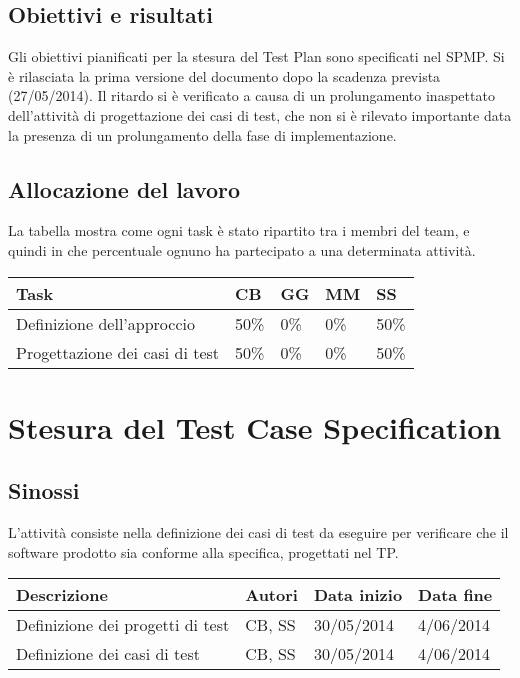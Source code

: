 \subsection{Obiettivi e risultati}
Gli obiettivi pianificati per la stesura del Test Plan sono specificati nel SPMP. Si è rilasciata la prima versione del documento dopo la scadenza prevista (27/05/2014). Il ritardo si è verificato a causa di un prolungamento inaspettato dell'attività di progettazione dei casi di test, che non si è rilevato importante data la presenza di un prolungamento della fase di implementazione.

\subsection{Allocazione del lavoro}
La tabella mostra come ogni task è stato ripartito tra i membri del team, e quindi in che percentuale ognuno ha partecipato a una determinata attività.
\begin{table}[ht]
 \begin{tabular}{|p{7.5cm}|p{1cm}|p{1cm}|p{1cm}|p{1cm}|}
  \hline
  \rowcolor{Gray}\textbf{Task}			& \textbf{CB}		& \textbf{GG}		& \textbf{MM}		& \textbf{SS}		\\
  \hline
  Definizione dell'approccio			& 50\%			& 0\%			& 0\%			& 50\%			\\
  \hline
  Progettazione dei casi di test		& 50\%			& 0\%			& 0\%			& 50\%			\\
  \hline
 \end{tabular}
\end{table}



\section{Stesura del Test Case Specification}
\subsection{Sinossi}
L'attività consiste nella definizione dei casi di test da eseguire per verificare che il software prodotto sia conforme alla specifica, progettati nel TP.

\begin{table}[ht]
 \begin{tabular}{|p{6cm}|p{2cm}|p{2cm}|p{2cm}|}
    \hline
    \rowcolor{Gray}\textbf{Descrizione}			& \textbf{Autori}		& \textbf{Data inizio}			& \textbf{Data fine}	\\
    \hline
    Definizione dei progetti di test			& CB, SS			& 30/05/2014				& 4/06/2014		\\
    \hline
    Definizione dei casi di test			& CB, SS			& 30/05/2014				& 4/06/2014		\\
    \hline
 \end{tabular}
\end{table}

